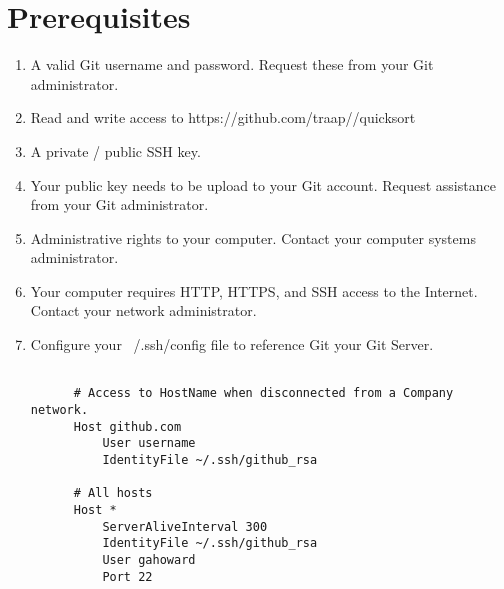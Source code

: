 \clearpage
\section{Prerequisites}
\begin{enumerate}
  \item A valid Git username and password.  Request these from your Git administrator.

  \item Read and write access to https://github.com/traap//quicksort

  \item A private / public SSH key.

  \item Your public key needs to be upload to your Git account.  Request
    assistance from your Git administrator.

  \item Administrative rights to your computer.  Contact your computer systems
    administrator.

  \item Your computer requires HTTP, HTTPS, and SSH access to the Internet.
    Contact your network administrator.

  \item Configure your ~/.ssh/config file to reference Git your Git Server.

  \begin{verbatim}

      # Access to HostName when disconnected from a Company network.
      Host github.com
          User username
          IdentityFile ~/.ssh/github_rsa

      # All hosts
      Host *
          ServerAliveInterval 300
          IdentityFile ~/.ssh/github_rsa
          User gahoward
          Port 22

  \end{verbatim}

\end{enumerate}
